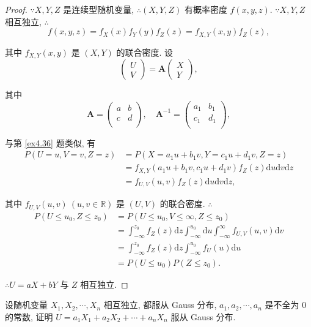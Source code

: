 \documentclass[color=black,device=normal,lang=cn]{elegantnote}
\numberwithin{equation}{section}
\theoremstyle{plain}
\numberwithin{exercise}{exsection}
\begin{document}
\begin{proof}
    $\because X,Y,Z$ 是连续型随机变量, $\therefore(X,Y,Z)$ 有概率密度 $f(x,y,z)$. $\because X,Y,Z$ 相互独立, $\therefore$
    \[f(x,y,z)=f_X(x)f_Y(y)f_Z(z)=f_{X,Y}(x,y)f_Z(z),\]

    其中 $f_{X,Y}(x,y)$ 是 $(X,Y)$ 的联合密度. 设
    \[\begin{pmatrix}
        U \\ V
    \end{pmatrix}=\boldsymbol{A}\begin{pmatrix}
        X \\ Y
    \end{pmatrix},\]
    
    其中
    \[\boldsymbol{A}=\begin{pmatrix}
        a & b \\
        c & d \\
    \end{pmatrix},\quad\boldsymbol{A}^{-1}=\begin{pmatrix}
        a_1 & b_1 \\
        c_1 & d_1 \\
    \end{pmatrix},\]

    与第 \ref{ex4.36} 题类似, 有
    \begin{align*}
        P(U=u,V=v,Z=z) & =P(X=a_1u+b_1v,Y=c_1u+d_1v,Z=z) \\
        & =f_{X,Y}(a_1u+b_1v,c_1u+d_1v)f_Z(z)\mathrm{d}u\mathrm{d}v\mathrm{d}z \\
        & =f_{U,V}(u,v)f_Z(z)\mathrm{d}u\mathrm{d}v\mathrm{d}z,
    \end{align*}

    其中 $f_{U,V}(u,v)\ (u,v\in\mathbb{R})$ 是 $(U,V)$ 的联合密度. $\therefore$
    \begin{align*}
        P(U\leq u_0,Z\leq z_0) & =P(U\leq u_0,V\leq\infty,Z\leq z_0) \\
        & =\int_{-\infty}^{z_0}f_Z(z)\mathrm{d}z\int_{-\infty}^{u_0}\mathrm{d}u\int_{-\infty}^\infty f_{U,V}(u,v)\mathrm{d}v \\
        & =\int_{-\infty}^{z_0}f_Z(z)\mathrm{d}z\int_{-\infty}^{u_0}f_U(u)\mathrm{d}u \\
        & =P(U\leq u_0)P(Z\leq z_0).
    \end{align*}

    $\therefore U=aX+bY$ 与 $Z$ 相互独立.
\end{proof}
\begin{exercise}\label{ex4.27}
    设随机变量 $X_1,X_2,\cdots,X_n$ 相互独立, 都服从 Gauss 分布, $a_1,a_2,\cdots,a_n$ 是不全为 $0$ 的常数, 证明 $U=a_1X_1+a_2X_2+\cdots+a_nX_n$ 服从 Gauss 分布.
\end{exercise}
\end{document}
